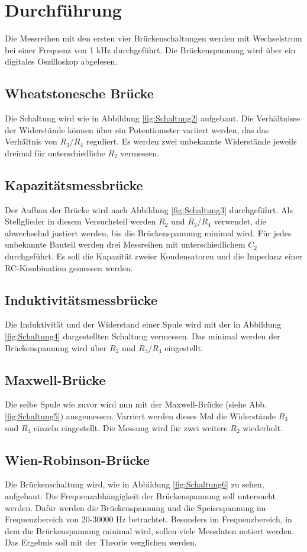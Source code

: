 \section{Durchführung}
\label{sec:Durchführung}

Die Messreihen mit den ersten vier Brückenschaltungen werden mit Wechselstrom bei einer Frequenz von 1 kHz durchgeführt.
Die Brückenspannung wird über ein digitales Oszilloskop abgelesen.

\subsection{Wheatstonesche Brücke}

Die Schaltung wird wie in Abbildung \ref{fig:Schaltung2} aufgebaut.
Die Verhältnisse der Widerstände können über ein Potentiometer variiert werden, das das Verhältnis von $R_3/R_4$ reguliert.
Es werden zwei unbekannte Widerstände jeweils dreimal für unterschiedliche $R_2$ vermessen.

\subsection{Kapazitätsmessbrücke}

Der Aufbau der Brücke wird nach Abbildung \ref{fig:Schaltung3} durchgeführt.
Als Stellglieder in diesem Versuchsteil werden $R_2$ und $R_3/R_4$ verwendet, die abwechselnd justiert werden, bis die Brückenspannung minimal wird.
Für jedes unbekannte Bauteil werden drei Messreihen mit unterschiedlichem $C_2$ durchgeführt.
Es soll die Kapazität zweier Kondensatoren und die Impedanz einer RC-Kombination gemessen werden.

\subsection{Induktivitätsmessbrücke}

Die Induktivität und der Widerstand einer Spule wird mit der in Abbildung \ref{fig:Schaltung4} dargestellten Schaltung vermessen.
Das minimal werden der Brückenspannung wird über $R_2$ und $R_3/R_4$ eingestellt.

\subsection{Maxwell-Brücke}

Die selbe Spule wie zuvor wird nun mit der Maxwell-Brücke (siehe Abb. \ref{fig:Schaltung5}) ausgemessen.
Varriert werden dieses Mal die Widerstände $R_3$ und $R_4$ einzeln eingestellt.
Die Messung wird für zwei weitere $R_2$ wiederholt.

\subsection{Wien-Robinson-Brücke}

Die Brückenschaltung wird, wie in Abbildung \ref{fig:Schaltung6} zu sehen, aufgebaut.
Die Frequenzabhängigkeit der Brückenspannung soll untersucht werden.
Dafür werden die Brückenspannung und  die Speisespannung im Frequenzbereich von 20-30000 Hz betrachtet.
Besonders im Frequenzbereich, in dem die Brückenspannung minimal wird, sollen viele Messdaten notiert werden.
Das Ergebnis soll mit der Theorie verglichen werden.
